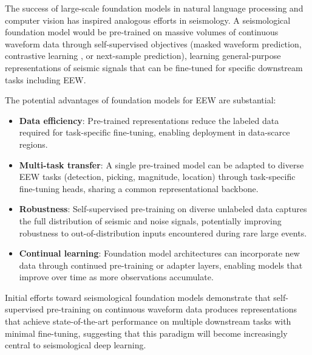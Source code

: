 \documentclass[review,authoryear]{elsarticle}
\begin{document}
The success of large-scale foundation models in natural language processing \citep{brown2020language, devlin2019bert} and computer vision \citep{dosovitskiy2021image} has inspired analogous efforts in seismology. A seismological foundation model would be pre-trained on massive volumes of continuous waveform data through self-supervised objectives (masked waveform prediction, contrastive learning \citep{chen2020simple}, or next-sample prediction), learning general-purpose representations of seismic signals that can be fine-tuned for specific downstream tasks including EEW.

The potential advantages of foundation models for EEW are substantial:
\begin{itemize}
\item \textbf{Data efficiency}: Pre-trained representations reduce the labeled data required for task-specific fine-tuning, enabling deployment in data-scarce regions.
\item \textbf{Multi-task transfer}: A single pre-trained model can be adapted to diverse EEW tasks (detection, picking, magnitude, location) through task-specific fine-tuning heads, sharing a common representational backbone.
\item \textbf{Robustness}: Self-supervised pre-training on diverse unlabeled data captures the full distribution of seismic and noise signals, potentially improving robustness to out-of-distribution inputs encountered during rare large events.
\item \textbf{Continual learning}: Foundation model architectures can incorporate new data through continued pre-training or adapter layers, enabling models that improve over time as more observations accumulate.
\end{itemize}

Initial efforts toward seismological foundation models \citep{earthquake2023foundation} demonstrate that self-supervised pre-training on continuous waveform data produces representations that achieve state-of-the-art performance on multiple downstream tasks with minimal fine-tuning, suggesting that this paradigm will become increasingly central to seismological deep learning.
\end{document}
